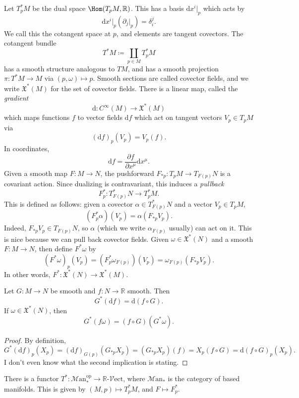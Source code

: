 
Let $T_p^*M$ be the dual space $\Hom(T_pM, \mathbb{R} ) $. This has a basis $\mathrm{d} x^i|_p$ which acts by
\[
	\mathrm{d} x^i|_p(\partial_j|_p)=\delta _i^j
.\]
We call this the cotangent space at $p$, and elements are tangent covectors. The cotangent bundle
\[
	T^*M \coloneqq \coprod_{p\in M} T_p^*M
\]
has a smooth structure analogous to $TM$, and has a smooth projection $\pi : T^*M \to M$ via $(p,\omega )\mapsto p$. Smooth sections are called covector fields, and we write $\mathfrak{X} ^*(M)$ for the set of covector fields. There is a linear map, called the \emph{gradient}
\[
	\mathrm{d} : C^\infty (M) \to \mathfrak{X} ^*(M)
\]
which maps functions $f$ to vector fields $\mathrm{d} f$ which act on tangent vectors $V_p\in T_pM$ via
\[
	(\mathrm{d} f)_p(V_p)=V_p(f)
.\]
In coordinates,
\[
	\mathrm{d} f = \frac{\partial f}{\partial x^\mu } \mathrm{d} x^\mu 
.\]
Given a smooth map $F : M \to N$, the pushforward $F_{*p} : T_pM \to T_{F(p)} N$ is a covariant action. Since dualizing is contravariant, this induces a \emph{pullback}
\[
	F_p^* : T_{F(p)} ^*N \to T_p^*M
.\]
This is defined as follows: given a covector $\alpha \in T_{F(p)} ^*N$ and a vector $V_p\in T_pM$,
\[
	(F^*_p\alpha )(V_p)=\alpha (F_{*p}V_p)
.\]
Indeed, $F_{*p} V_p \in T_{F(p)} N$, so $\alpha$ (which we write $\alpha _{F(p)} $ usually) can act on it. This is nice because we can pull back covector fields. Given $\omega \in \mathfrak{X} ^*(N)$ and a smooth $F : M \to N$, then define $F^*\omega $ by
\[
	(F^*\omega )_p(V_p)=(F^*_p\omega _{F(p)} )(V_p)=\omega _{F(p)} (F_{*p} V_p)
.\]
In other words, $F^* : \mathfrak{X} ^*(N) \to \mathfrak{X} ^*(M)$.

\begin{lemma}\label{???}
	Let $G : M \to N$ be smooth and $f : N \to \mathbb{R} $ smooth. Then
	\[
		G^*(\mathrm{d} f)=\mathrm{d} (f\circ G)
	.\]
	If $\omega \in \mathfrak{X} ^*(N)$, then
	\[
		G^*(f\omega )=(f\circ G)(G^*\omega )
	.\]
\end{lemma}
\begin{proof}
	By definition,
	\[
		G^*(\mathrm{d} f)_p(X_p)=(\mathrm{d} f)_{G(p)} (G_{*p}X_p)=(G_{*p}X_p)(f)=X_p(f\circ G)=\mathrm{d} (f\circ G)_p(X_p)
	.\]
	I don't even know what the second implication is stating.
\end{proof}
\begin{remark}
	There is a functor $T^* : \mathcal{M} \mathrm{an}_*^{\mathrm{op}}  \to \mathbb{R} $-$\mathcal{V} \mathrm{ect} $, where $\mathcal{M} \mathrm{an} _*$ is the category of based manifolds. This is given by $(M,p)\mapsto T_p^*M$, and $F\mapsto F^*_p$.
\end{remark}

